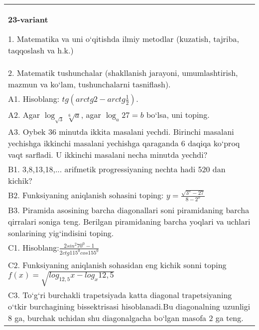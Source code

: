 \documentclass{article}
\begin{document}
\begin{tabular}{m{17cm}}
\textbf{23-variant}

1. Matematika va uni o‘qitishda ilmiy metodlar (kuzatish, tajriba, taqqoslash va h.k.) \\
2. Matematik tushunchalar (shakllanish jarayoni, umumlashtirish, mazmun va ko‘lam, tushunchalarni tasniflash). \\
A1. Hisoblang: \(tg\left (arctg2 - arctg\frac{1}{2} \right) \). \\
A2. Agar \(\log_{\sqrt{3}}\sqrt[6]{a}\), agar \(\log_{a}27 = b\) bo‘lsa, uni toping. \\
A3. Oybek 36 minutda ikkita masalani yechdi. Birinchi masalani yechishga ikkinchi masalani yechishga qaraganda 6 daqiqa ko‘proq vaqt sarfladi. U ikkinchi masalani necha minutda yechdi? \\
B1. 3,8,13,18,... arifmetik progressiyaning nechta hadi 520 dan kichik? \\
B2. Funksiyaning aniqlanish sohasini toping: \(y = \frac{\sqrt{3^{x} - 27}}{8 - 2^{x}}\) \\
B3. Piramida asosining barcha diagonallari soni piramidaning barcha qirralari soniga teng. Berilgan piramidaning barcha yoqlari va uchlari sonlarining yig‘indisini toping. \\
C1. Hisoblang:\(\frac{2sin^{2}70^{0} - 1}{2ctg115^{0}cos155^{0}}\) \\
C2. Funksiyaning aniqlanish sohasidan eng kichik sonni toping \(f (x) = \sqrt{log_{12,5}x - log_{x}12,5}\) \\
C3. To‘g‘ri burchakli trapetsiyada katta diagonal trapetsiyaning o‘tkir burchagining bissektrisasi hisoblanadi.Bu diagonalning uzunligi 8 ga, burchak uchidan shu diagonalgacha bo‘lgan masofa 2 ga teng. \\

\end{tabular}
\vspace{1cm}
\end{document}
